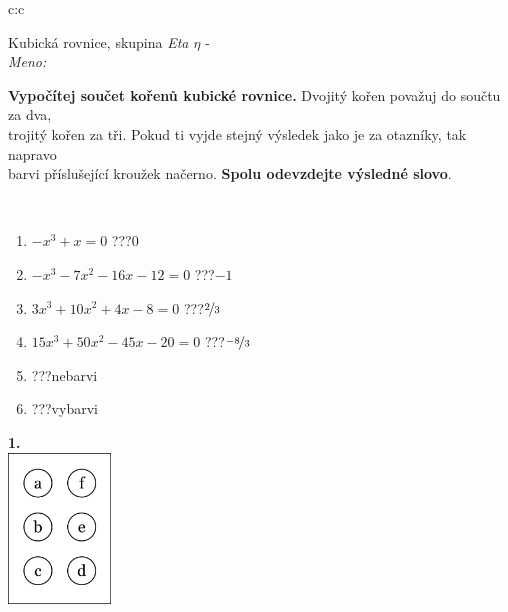 \documentclass[10pt]{report}
\begin{document}
\begin{tabular}{c:c}
\begin{minipage}[c][104.5mm][t]{0.5\linewidth}
\begin{center}
\vspace{7mm}
{\huge Kubická rovnice, skupina \textit{Eta $\eta$} -}\\[5mm]
\textit{Meno:}\phantom{xxxxxxxxxxxxxxxxxxxxxxxxxxxxxxxxxxxxxxxxxxxxxxxxxxxxxxxxxxxxxxxxx}\\[5mm]
\begin{minipage}{0.95\linewidth}
\textbf{Vypočítej součet kořenů kubické rovnice.} Dvojitý kořen považuj do součtu za dva,\\trojitý kořen za tři. Pokud ti vyjde stejný výsledek jako je za otazníky, tak napravo\\barvi příslušející kroužek načerno. \textbf{Spolu odevzdejte výsledné slovo}.
\end{minipage}
\\[1mm]
\begin{minipage}{0.79\linewidth}
\begin{center}
\begin{varwidth}{\linewidth}
\begin{enumerate}
\Large
\item $-x^3+x=0$\quad \dotfill\; ???\;\dotfill \quad $0$
\item $-x^3-7x^2-16x-12=0$\quad \dotfill\; ???\;\dotfill \quad $-1$
\item $3x^3+10x^2+4x-8=0$\quad \dotfill\; ???\;\dotfill \quad $\nicefrac{2}{3}$
\item $15x^3+50x^2-45x-20=0$\quad \dotfill\; ???\;\dotfill \quad $\nicefrac{-8}{3}$
\item \quad \dotfill\; ???\;\dotfill \quad nebarvi
\item \quad \dotfill\; ???\;\dotfill \quad vybarvi
\end{enumerate}
\end{varwidth}
\end{center}
\end{minipage}
\begin{minipage}{0.20\linewidth}
\begin{center}
{\Huge\bfseries 1.} \\[2mm]
\includegraphics[height=40mm]{../images/braille.png}

\end{center}
\end{minipage}
\end{center}
\end{minipage}
\end{tabular}
\end{document}
